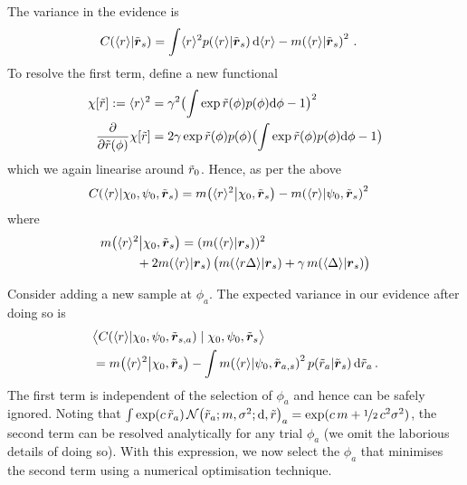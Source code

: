 \documentclass{article}
\begin{document}
The variance in the evidence is
\begin{align*}
\cov{\langle r\rangle}{\tvr_{s}}
& = \int \inty{r}^2 \p{\inty{r}}{\tvr_s} \ud\inty{r}- \mean{\inty{r}}{\tvr_s}^2\,.
\end{align*}
To resolve the first term, define a new functional
\begin{align*}
 \chi[\tr] \deq \inty{r}^2 & = \gamma^2\bigl(\int  \exp \tr(\phi) p(\phi) \ud \phi-1\bigr)^2\\
\pderiv{}{\tr(\phi)}\chi[\tr] & = 2\gamma \exp \tr(\phi) p(\phi) \bigl(\int  \exp \tr(\phi) p(\phi) \ud \phi-1\bigr)
\end{align*}
which we again linearise around $\tr_0$. Hence, as per the above
\begin{align*}
& \cov{\langle r\rangle}{\chi_0,\psi_0,\tvr_{s}} = \mean{\inty{r}^2}{\chi_0,\tvr_s} - \mean{\inty{r}}{\psi_0,\tvr_s}^2
\end{align*}
where
\begin{align*}
&\mean{\inty{r}^2}{\chi_0,\tvr_s} = (\mean{\inty{r}}{\vr_s})^2 \\
& \hspace{1cm}  + 2\mean{\inty{r}}{\vr_s}
\bigl(\mean{\inty{r \Delta}}{\vr_s} + \gamma\, \mean{\inty{\Delta}}{\vr_s}\bigr)
\end{align*}


Consider adding a new sample at $\phi_a$. The expected variance in our evidence after doing so is
\begin{align*}
& \bigl\langle \cov{\langle r\rangle}{\chi_0,\psi_0,\tvr_{s,a}}\mid \chi_0,\psi_0,\tvr_{s}\bigr\rangle\\
& = \mean{\inty{r}^2}{\chi_0,\tvr_s}  - 
\int\mean{\inty{r}}{\psi_0,\tvr_{a,s}}^2\p{\tr_a}{\tvr_s}\ud\tr_a\,.
\end{align*}
The first term is independent of the selection of $\phi_a$ and hence can be safely ignored. Noting that $\int \exp(c\, \tr_a)\, \N{\tr_a;m, \sigma^2} \ud\tr_a = \exp(c\, m + \nicefrac{1}{2}\, c^2 \sigma^2)$, the second term can be resolved analytically for any trial $\phi_a$ (we omit the laborious details of doing so). With this expression, we now select the $\phi_a$ that minimises the second term using a numerical optimisation technique. 
\end{document}
